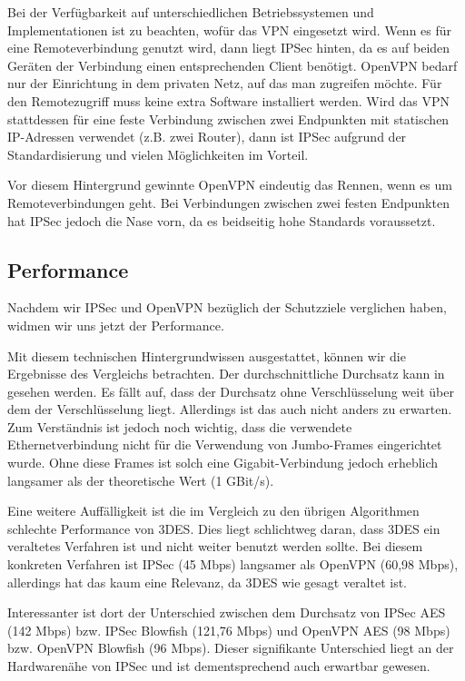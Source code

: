 \documentclass[12pt]{scrartcl}
\begin{document}
Bei der Verfügbarkeit auf unterschiedlichen Betriebssystemen und Implementationen ist zu beachten, wofür das VPN eingesetzt wird. Wenn es für eine Remoteverbindung genutzt wird, dann liegt IPSec hinten, da es auf beiden Geräten der Verbindung einen entsprechenden Client benötigt. OpenVPN bedarf nur der Einrichtung in dem privaten Netz, auf das man zugreifen möchte. Für den Remotezugriff muss keine extra Software installiert werden. Wird das VPN stattdessen für eine feste Verbindung zwischen zwei Endpunkten mit statischen IP-Adressen verwendet (z.B. zwei Router), dann ist IPSec aufgrund der Standardisierung und vielen Möglichkeiten im Vorteil.\cite{Sun2011} 

Vor diesem Hintergrund gewinnte OpenVPN eindeutig das Rennen, wenn es um Remoteverbindungen geht. Bei Verbindungen zwischen zwei festen Endpunkten hat IPSec jedoch die Nase vorn, da es beidseitig hohe Standards voraussetzt.

\subsection{Performance}
Nachdem wir IPSec und OpenVPN bezüglich der Schutzziele verglichen haben, widmen wir uns jetzt der Performance.

Mit diesem technischen Hintergrundwissen ausgestattet, können wir die Ergebnisse des Vergleichs betrachten. Der durchschnittliche Durchsatz kann in  gesehen werden. Es fällt auf, dass der Durchsatz ohne Verschlüsselung weit über dem der Verschlüsselung liegt. Allerdings ist das auch nicht anders zu erwarten. Zum Verständnis ist jedoch noch wichtig, dass die verwendete Ethernetverbindung nicht für die Verwendung von Jumbo-Frames eingerichtet wurde. Ohne diese Frames ist solch eine Gigabit-Verbindung jedoch erheblich langsamer als der theoretische Wert (1 GBit/s).\cite{Kotuliak2011}

Eine weitere Auffälligkeit ist die im Vergleich zu den übrigen Algorithmen schlechte Performance von 3DES. Dies liegt schlichtweg daran, dass 3DES ein veraltetes Verfahren ist und nicht weiter benutzt werden sollte. Bei diesem konkreten Verfahren ist IPSec (45 Mbps) langsamer als OpenVPN (60,98 Mbps), allerdings hat das kaum eine Relevanz, da 3DES wie gesagt veraltet ist.

Interessanter ist dort der Unterschied zwischen dem Durchsatz von IPSec AES (142 Mbps) bzw. IPSec Blowfish (121,76 Mbps) und OpenVPN AES (98 Mbps) bzw. OpenVPN Blowfish (96 Mbps). Dieser signifikante Unterschied liegt an der Hardwarenähe von IPSec und ist dementsprechend auch erwartbar gewesen.
\end{document}
